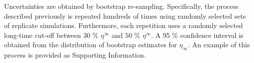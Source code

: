 \documentclass[preprint,review,12pt]{elsarticle}
\begin{document}
	Uncertainties are obtained by bootstrap re-sampling. Specifically, the process described previously is repeated hundreds of times using randomly selected sets of replicate simulations. Furthermore, each repetition uses a randomly selected long-time cut-off between $30$ \% $\eta^{\infty}$ and $50$ \% $\eta^{\infty}$. A 95 \% confidence interval is obtained from the distribution of bootstrap estimates for $\eta_\infty$. An example of this process is provided as Supporting Information.
	
	
	
	
\end{document}
